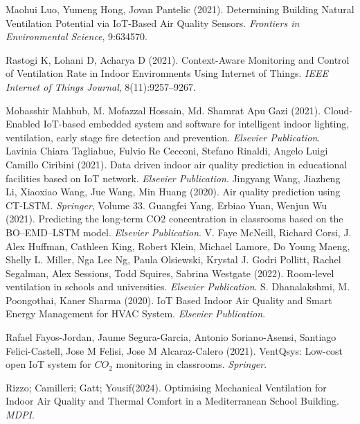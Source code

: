 \documentclass[a4paper,12pt,oneside]{book}
\begin{document}
%
%
%
% 
% 
%
\begin{thebibliography}{00}
    Maohui Luo, Yumeng Hong, Jovan Pantelic (2021). Determining Building Natural Ventilation Potential via IoT-Based Air Quality Sensors. \textit{Frontiers in Environmental Science}, 9:634570. 
    
    Rastogi K, Lohani D, Acharya D (2021). Context-Aware Monitoring and Control of Ventilation Rate in Indoor Environments Using Internet of Things. \textit{IEEE Internet of Things Journal}, 8(11):9257–9267. 
    
    Mobasshir Mahbub, M. Mofazzal Hossain, Md. Shamrat Apu Gazi (2021). Cloud-Enabled IoT-based embedded system and software for intelligent indoor lighting, ventilation, early stage fire detection and prevention. \textit{Elsevier Publication}. 
    Lavinia Chiara Tagliabue, Fulvio Re Cecconi, Stefano Rinaldi, Angelo Luigi Camillo Ciribini (2021). Data driven indoor air quality prediction in educational facilities based on IoT network. \textit{Elsevier Publication}. 
    Jingyang Wang, Jiazheng Li, Xiaoxiao Wang, Jue Wang, Min Huang (2020). Air quality prediction using CT-LSTM. \textit{Springer}, Volume 33. 
    Guangfei Yang, Erbiao Yuan, Wenjun Wu (2021). Predicting the long-term CO2 concentration in classrooms based on the BO–EMD–LSTM model. \textit{Elsevier Publication}. 
    V. Faye McNeill, Richard Corsi, J. Alex Huffman, Cathleen King, Robert Klein, Michael Lamore, Do Young Maeng, Shelly L. Miller, Nga Lee Ng, Paula Olsiewski, Krystal J. Godri Pollitt, Rachel Segalman, Alex Sessions, Todd Squires, Sabrina Westgate (2022). Room-level ventilation in schools and universities. \textit{Elsevier Publication}. 
    S. Dhanalakshmi, M. Poongothai, Kaner Sharma (2020). IoT Based Indoor Air Quality and Smart Energy Management for HVAC System. \textit{Elsevier Publication}. 
    
    Rafael Fayos-Jordan, Jaume Segura-Garcia, Antonio Soriano-Asensi, Santiago Felici-Castell, Jose M Felisi, Jose M Alcaraz-Calero (2021). VentQsys: Low-cost open IoT system for \( CO_2 \) monitoring in classrooms. \textit{Springer}. 

     Rizzo; Camilleri; Gatt; Yousif(2024). Optimising Mechanical Ventilation for Indoor Air Quality and Thermal Comfort in a Mediterranean School Building. \textit{MDPI}. 
    

\end{thebibliography}
\end{document}
